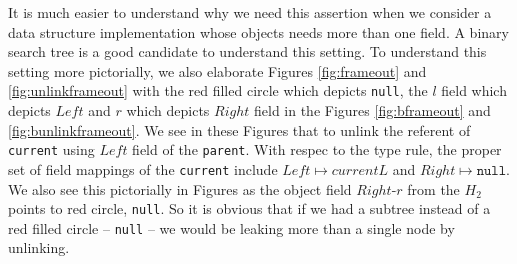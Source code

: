 It is much easier to understand why we need this assertion when we consider a data structure implementation whose objects needs more than one field. A binary search tree is a good candidate to understand this setting. To understand this setting more pictorially, we also elaborate Figures \ref{fig:frameout} and \ref{fig:unlinkframeout} with the red filled circle which depicts \texttt{null}, the $l$ field which depicts $Left$ and $r$ which depicts $Right$ field in the Figures \ref{fig:bframeout} and \ref{fig:bunlinkframeout}. We see in these Figures that to unlink the referent of \texttt{current} using $Left$ field of the \texttt{parent}. With respec to the type rule, the proper set of field mappings of the \texttt{current} include $Left \mapsto currentL$ and $Right \mapsto \texttt{null}$. We also see this pictorially in Figures as the object field $Right$-$r$ from the $H_2$ points to red circle, \texttt{null}. So it is obvious that if we had a subtree instead of a red filled circle -- \texttt{null} -- we would be leaking more than a single node by unlinking.
